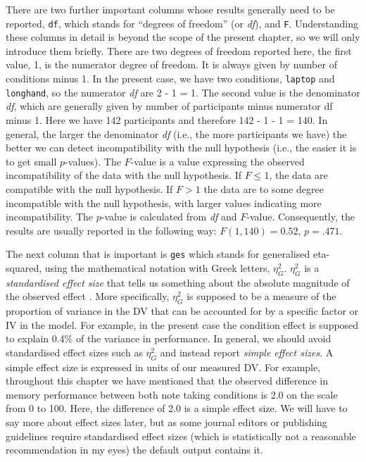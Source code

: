 \documentclass[
]{book}
\begin{document}
There are two further important columns whose results generally need to be reported, \texttt{df}, which stands for ``degrees of freedom'' (or \emph{df}), and \texttt{F}. Understanding these columns in detail is beyond the scope of the present chapter, so we will only introduce them briefly. There are two degrees of freedom reported here, the first value, 1, is the numerator degree of freedom. It is always given by number of conditions minus 1. In the present case, we have two conditions, \texttt{laptop} and \texttt{longhand}, so the numerator \emph{df} are 2 - 1 = 1. The second value is the denominator \emph{df}, which are generally given by number of participants minus numerator df minus 1. Here we have 142 participants and therefore 142 - 1 - 1 = 140. In general, the larger the denominator \emph{df} (i.e., the more participants we have) the better we can detect incompatibility with the null hypothesis (i.e., the easier it is to get small \(p\)-values). The \(F\)-value is a value expressing the observed incompatibility of the data with the null hypothesis. If \(F \leq 1\), the data are compatible with the null hypothesis. If \(F > 1\) the data are to some degree incompatible with the null hypothesis, with larger values indicating more incompatibility. The \(p\)-value is calculated from \emph{df} and \(F\)-value. Consequently, the results are usually reported in the following way: \(F(1, 140) = 0.52\), \(p = .471\).

The next column that is important is \texttt{ges} which stands for generalised eta-squared, using the mathematical notation with Greek letters, \(\eta^2_G\). \(\eta^2_G\) is a \emph{standardised effect size} that tells us something about the absolute magnitude of the observed effect \citep{olejnikGeneralizedEtaOmega2003, bakemanRecommendedEffectSize2005}. More specifically, \(\eta^2_G\) is supposed to be a measure of the proportion of variance in the DV that can be accounted for by a specific factor or IV in the model. For example, in the present case the condition effect is supposed to explain 0.4\% of the variance in performance. In general, we should avoid standardised effect sizes such as \(\eta^2_G\) and instead report \emph{simple effect sizes}. A simple effect size is expressed in units of our measured DV. For example, throughout this chapter we have mentioned that the observed difference in memory performance between both note taking conditions is 2.0 on the scale from 0 to 100. Here, the difference of 2.0 is a simple effect size. We will have to say more about effect sizes later, but as some journal editors or publishing guidelines require standardised effect sizes (which is statistically not a reasonable recommendation in my eyes) the default output contains it.
\end{document}
